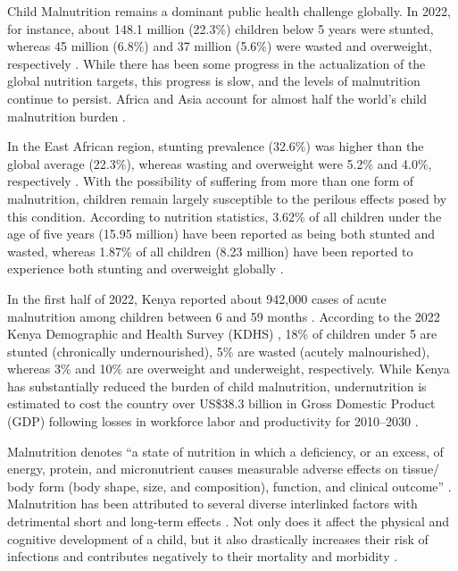 \documentclass[sn-basic,Numbered,pdflatex]{sn-jnl}
\theoremstyle{remark}
\theoremstyle{definition}
\begin{document}
Child Malnutrition remains a dominant public health challenge globally.
In 2022, for instance, about 148.1 million (22.3\%) children below 5
years were stunted, whereas 45 million (6.8\%) and 37 million (5.6\%)
were wasted and overweight, respectively \citep{who2023}. While there
has been some progress in the actualization of the global nutrition
targets, this progress is slow, and the levels of malnutrition continue
to persist. Africa and Asia account for almost half the world's child
malnutrition burden \citep{who2023}.

In the East African region, stunting prevalence (32.6\%) was higher than
the global average (22.3\%), whereas wasting and overweight were 5.2\%
and 4.0\%, respectively \citep{IEG2022}. With the possibility of
suffering from more than one form of malnutrition, children remain
largely susceptible to the perilous effects posed by this condition.
According to nutrition statistics, 3.62\% of all children under the age
of five years (15.95 million) have been reported as being both stunted
and wasted, whereas 1.87\% of all children (8.23 million) have been
reported to experience both stunting and overweight globally
\citep{global}.

In the first half of 2022, Kenya reported about 942,000 cases of acute
malnutrition among children between 6 and 59 months
\citep{Bhavnani2023}. According to the 2022 Kenya Demographic and Health
Survey (KDHS) \citep{KNBSICF2023}, 18\% of children under 5 are stunted
(chronically undernourished), 5\% are wasted (acutely malnourished),
whereas 3\% and 10\% are overweight and underweight, respectively. While
Kenya has substantially reduced the burden of child malnutrition,
undernutrition is estimated to cost the country over US\$38.3 billion in
Gross Domestic Product (GDP) following losses in workforce labor and
productivity for 2010--2030 \citep{USAID2018}.

Malnutrition denotes ``a state of nutrition in which a deficiency, or an
excess, of energy, protein, and micronutrient causes measurable adverse
effects on tissue/ body form (body shape, size, and composition),
function, and clinical outcome'' \citep{stratton2003}. Malnutrition has
been attributed to several diverse interlinked factors with detrimental
short and long-term effects \citep{Pelletier1995, Pelletier2003}. Not
only does it affect the physical and cognitive development of a child,
but it also drastically increases their risk of infections and
contributes negatively to their mortality and morbidity
\citep{Rice2000, jonah2018, victora2008, kar2008, mendez1999, walker2015, rabbani2016}.
\end{document}
